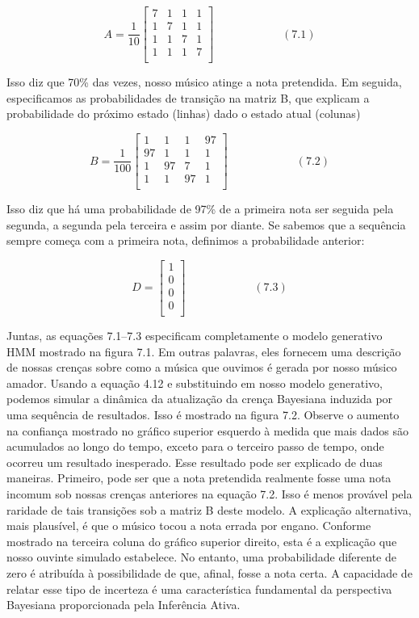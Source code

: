\documentclass[
  12pt,
]{book}
\begin{document}
\[ A = \frac{1}{10}\begin{bmatrix} 
7 & 1 & 1 & 1  \\ 
1 & 7 & 1 & 1  \\
1 & 1 & 7 & 1  \\ 
1 & 1 & 1 & 7  \\ 
\end{bmatrix} \qquad\qquad\qquad (7.1) \]

Isso diz que 70\% das vezes, nosso músico atinge a nota pretendida. Em seguida, especificamos as probabilidades de transição na matriz B, que explicam a probabilidade do próximo estado (linhas) dado o estado atual (colunas)

\[ B = \frac{1}{100}\begin{bmatrix} 
1 & 1 & 1 & 97  \\ 
97 & 1 & 1 & 1  \\
1 & 97 & 7 & 1  \\ 
1 & 1 & 97 & 1  \\ 
\end{bmatrix} \qquad\qquad\qquad (7.2) \]

Isso diz que há uma probabilidade de 97\% de a primeira nota ser seguida pela segunda, a segunda pela terceira e assim por diante. Se sabemos que a sequência sempre começa com a primeira nota, definimos a probabilidade anterior:

\[ D = \begin{bmatrix} 
1  \\ 
0 \\ 
0 \\ 
0 \\ 
\end{bmatrix} \qquad\qquad\qquad (7.3) \]

Juntas, as equações 7.1--7.3 especificam completamente o modelo generativo HMM mostrado na figura 7.1. Em outras palavras, eles fornecem uma descrição de nossas crenças sobre como a música que ouvimos é gerada por nosso músico amador. Usando a equação 4.12 e substituindo em nosso modelo generativo, podemos simular a dinâmica da atualização da crença Bayesiana induzida por uma sequência de resultados. Isso é mostrado na figura 7.2. Observe o aumento na confiança mostrado no gráfico superior esquerdo à medida que mais dados são acumulados ao longo do tempo, exceto para o terceiro passo de tempo, onde ocorreu um resultado inesperado. Esse resultado pode ser explicado de duas maneiras. Primeiro, pode ser que a nota pretendida realmente fosse uma nota incomum sob nossas crenças anteriores na equação 7.2. Isso é menos provável pela raridade de tais transições sob a matriz B deste modelo. A explicação alternativa, mais plausível, é que o músico tocou a nota errada por engano. Conforme mostrado na terceira coluna do gráfico superior direito, esta é a explicação que nosso ouvinte simulado estabelece. No entanto, uma probabilidade diferente de zero é atribuída à possibilidade de que, afinal, fosse a nota certa. A capacidade de relatar esse tipo de incerteza é uma característica fundamental da perspectiva Bayesiana proporcionada pela Inferência Ativa.
\end{document}
